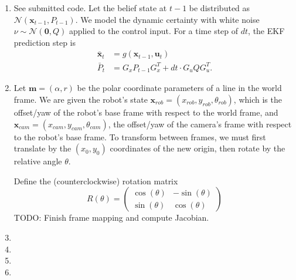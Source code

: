 \documentclass[12pt]{article}
\begin{document}
\begin{enumerate}
\begin{align*}
\begin{array}{cc}
		\sin(\theta_t) - \sin(\theta_{t-1}) & -\frac{V_t}{\omega_t}(\sin(\theta_t) - \sin(\theta_{t-1})) + V_t\cos(\theta_t)dt \\
		-\cos(\theta_t) + \cos(\theta_{t-1}) & \frac{V_t}{\omega_t}(\cos(\theta_t) - \cos(\theta_{t-1})) + V_t\sin(\theta_t)dt \\
		0 & \omega_tdt
		\end{array}\right).
	\end{align*}
	where $\theta_t := \theta_{t-1} + \omega_tdt$.
	\item See submitted code. Let the belief state at $t-1$ be distributed as $\mathcal{N}(\mathbf{x}_{t-1}, P_{t-1})$. We model the dynamic certainty with white noise $\nu \sim \mathcal{N}(\mathbf{0}, Q)$ applied to the control input. For a time step of $dt$, the EKF prediction step is
	\begin{align*}
		\bar{\mathbf{x}}_t &= g(\mathbf{x}_{t-1}, \mathbf{u}_t) \\
		\bar P_t &= G_xP_{t-1}G_x^T + dt \cdot G_uQG_u^T.
	\end{align*}
	\item Let $\mathbf{m} = (\alpha, r)$ be the polar coordinate parameters of a line in the world frame. We are given the robot's state $\mathbf{x}_{rob} = (x_{rob}, y_{rob}, \theta_{rob})$, which is the offset/yaw of the robot's base frame with respect to the world frame, and $\mathbf{x}_{cam} = (x_{cam}, y_{cam}, \theta_{cam})$, the offset/yaw of the camera's frame with respect to the robot's base frame. To transform between frames, we must first translate by the $(x_0,y_0)$ coordinates of the new origin, then rotate by the relative angle $\theta$.
	
	Define the (counterclockwise) rotation matrix
	\[
		R(\theta) = \left(\begin{array}{cc}
			\cos(\theta) & -\sin(\theta) \\
			\sin(\theta) & \cos(\theta)
		\end{array}\right)
	\]
	TODO: Finish frame mapping and compute Jacobian.
	\item 
	\item 
	\item 
	\item 
\end{enumerate}
\end{document}
